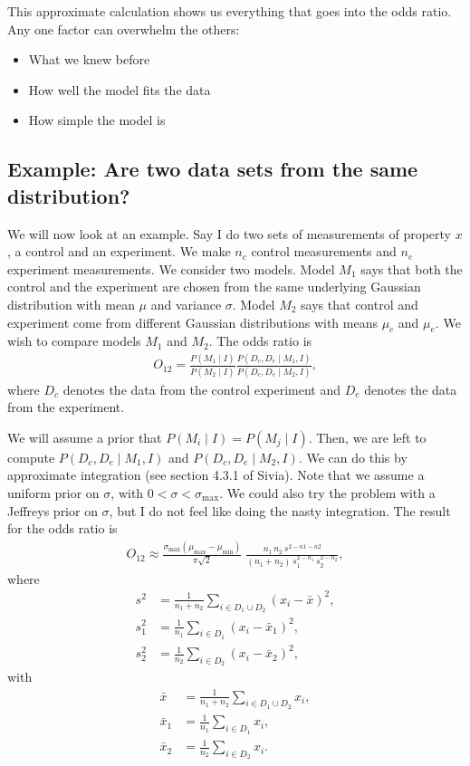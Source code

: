 This approximate calculation shows us everything that goes into the
odds ratio.  Any one factor can overwhelm the others:
\begin{itemize}
\item What we knew before
\item How well the model fits the data
\item How simple the model is
\end{itemize}


\subsection{Example: Are two data sets from the same distribution?}
We will now look at an example.  Say I do two sets of measurements of
property $x$, a control and an experiment.  We make $n_c$ control
measurements and $n_e$ experiment measurements.  We consider two
models.  Model $M_1$ says that both the control and the experiment are
chosen from the same underlying Gaussian distribution with mean $\mu$
and variance $\sigma$.  Model $M_2$ says that control and experiment
come from different Gaussian distributions with means $\mu_c$ and
$\mu_e$.  We wish to compare models $M_1$ and $M_2$.  The odds ratio is
\begin{align}
O_{12} = \frac{P(M_1\mid I)}{P(M_2\mid I)}
\frac{P(D_c,D_e\mid M_1, I)}{P(D_c,D_e\mid M_2, I)},
\end{align}
where $D_c$ denotes the data from the control experiment and $D_e$
denotes the data from the experiment.

We will assume a prior that $P(M_i\mid I) = P(M_j \mid I)$.  Then, we
are left to compute $P(D_c,D_e\mid M_1, I)$ and
$P(D_c,D_e\mid M_2, I)$.  We can do this by approximate
integration (see section 4.3.1 of Sivia).  Note that we assume a
uniform prior on $\sigma$, with $0 < \sigma < \sigma_\mathrm{max}$.
We could also try the problem with a Jeffreys prior on $\sigma$, but I
do not feel like doing the nasty integration.  The result for the odds
ratio is
\begin{align}
O_{12} \approx \frac{\sigma_\mathrm{max}\left(\mu_\mathrm{max} - \mu_\mathrm{min}\right)}{\pi \sqrt{2}}\;\frac{n_1\,n_2\, s^{2-n1-n2}}{(n_1+n_2)\,s_1^{2-n_1}\,s_2^{2-n_2}},
\end{align}
where
\begin{align}
s^2 &= \frac{1}{n_1+n_2}\sum_{i\in D_1 \cup D_2} (x_i - \bar{x})^2, \\
s_1^2 &= \frac{1}{n_1}\sum_{i\in D_1} (x_i - \bar{x}_1)^2, \\
s_2^2 &= \frac{1}{n_2}\sum_{i\in D_2} (x_i - \bar{x}_2)^2,
\end{align}
with
\begin{align}
  \bar{x} &= \frac{1}{n_1+n_2}\sum_{i\in D_1 \cup D_2} x_i,\\
  \bar{x}_1 &= \frac{1}{n_1}\sum_{i\in D_1} x_i,\\
  \bar{x}_2 &= \frac{1}{n_2}\sum_{i\in D_2} x_i.
\end{align}

